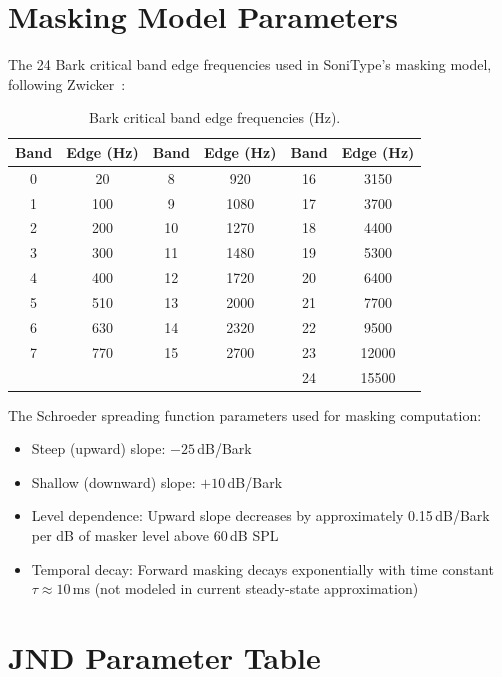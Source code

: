\documentclass[sigchi, nonacm]{acmart}
\begin{document}
\section{Masking Model Parameters}
\label{sec:appendix_masking}

The 24 Bark critical band edge frequencies used in SoniType's masking model, following Zwicker~\cite{zwicker2013psychoacoustics}:

\begin{table}[h]
\centering
\caption{Bark critical band edge frequencies (Hz).}
\label{tab:bark_bands}
\small
\begin{tabular}{cc|cc|cc}
\toprule
\textbf{Band} & \textbf{Edge (Hz)} & \textbf{Band} & \textbf{Edge (Hz)} & \textbf{Band} & \textbf{Edge (Hz)} \\
\midrule
0 & 20 & 8 & 920 & 16 & 3150 \\
1 & 100 & 9 & 1080 & 17 & 3700 \\
2 & 200 & 10 & 1270 & 18 & 4400 \\
3 & 300 & 11 & 1480 & 19 & 5300 \\
4 & 400 & 12 & 1720 & 20 & 6400 \\
5 & 510 & 13 & 2000 & 21 & 7700 \\
6 & 630 & 14 & 2320 & 22 & 9500 \\
7 & 770 & 15 & 2700 & 23 & 12000 \\
& & & & 24 & 15500 \\
\bottomrule
\end{tabular}
\end{table}

The Schroeder spreading function parameters used for masking computation:

\begin{itemize}
    \item Steep (upward) slope: $-25$\,dB/Bark
    \item Shallow (downward) slope: $+10$\,dB/Bark
    \item Level dependence: Upward slope decreases by approximately 0.15\,dB/Bark per dB of masker level above 60\,dB SPL
    \item Temporal decay: Forward masking decays exponentially with time constant $\tau \approx 10$\,ms (not modeled in current steady-state approximation)
\end{itemize}

\section{JND Parameter Table}
\label{sec:appendix_jnd}
\end{document}
